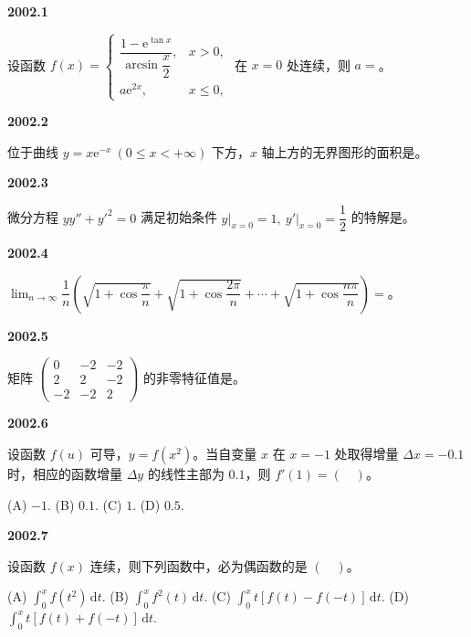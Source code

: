 \documentclass[UTF8,12pt,fontset=windows]{ctexart}
\begin{document}
{\large\bfseries 2002.1}

设函数 $f(x)=\begin{cases}\dfrac{1-\mathrm{e}^{\tan x}}{\arcsin\dfrac{x}{2}}, & x>0,\\[4pt] a\mathrm{e}^{2x}, & x\le0,\end{cases}$ 在 $x=0$ 处连续，则 $a=$\underline{\hspace{20mm}}。

\vfill
\newpage
{\large\bfseries 2002.2}

位于曲线 $y=x\mathrm{e}^{-x}\ (0\le x<+\infty)$ 下方，$x$ 轴上方的无界图形的面积是\underline{\hspace{20mm}}。

\vfill
\newpage
{\large\bfseries 2002.3}

微分方程 $yy''+y'^2=0$ 满足初始条件 $y\big|_{x=0}=1,\ y'\big|_{x=0}=\dfrac{1}{2}$ 的特解是\underline{\hspace{20mm}}。

\vfill
\newpage
{\large\bfseries 2002.4}

$\lim_{n\to\infty}\dfrac{1}{n}\left(\sqrt{1+\cos\dfrac{\pi}{n}}+\sqrt{1+\cos\dfrac{2\pi}{n}}+\cdots+\sqrt{1+\cos\dfrac{n\pi}{n}}\right)=$\underline{\hspace{20mm}}。

\vfill
\newpage
{\large\bfseries 2002.5}

矩阵 $\begin{pmatrix}0&-2&-2\\2&2&-2\\-2&-2&2\end{pmatrix}$ 的非零特征值是\underline{\hspace{20mm}}。

\vfill
\newpage
{\large\bfseries 2002.6}

设函数 $f(u)$ 可导，$y=f(x^2)$。当自变量 $x$ 在 $x=-1$ 处取得增量 $\Delta x=-0.1$ 时，相应的函数增量 $\Delta y$ 的线性主部为 $0.1$，则 $f'(1)=(\quad)$。

(A) $-1$.  (B) $0.1$.  (C) $1$.  (D) $0.5$.

\vfill
\newpage
{\large\bfseries 2002.7}

设函数 $f(x)$ 连续，则下列函数中，必为偶函数的是 $(\quad)$。

(A) $\int_0^x f(t^2)\,\mathrm{d}t$.  (B) $\int_0^x f^2(t)\,\mathrm{d}t$.  (C) $\int_0^x t[f(t)-f(-t)]\,\mathrm{d}t$.  (D) $\int_0^x t[f(t)+f(-t)]\,\mathrm{d}t$.
\end{document}
